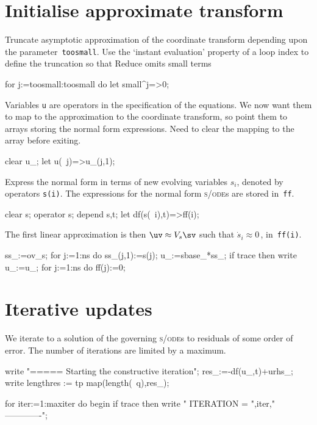 \documentclass[11pt,a5paper]{article}
\def\sde{\textsc{s/ode}}
\begin{document}
\section{Initialise approximate transform}

Truncate asymptotic approximation of the coordinate
transform depending upon the parameter~\verb|toosmall|. Use
the `instant evaluation' property of a loop index to define
the truncation so that Reduce omits small terms 
\begin{reduce}
for j:=toosmall:toosmall do let small^j=>0;
\end{reduce}

Variables \verb|u| are operators in
the specification of the equations. We now want them to map
to the approximation to the coordinate transform, so point
them to arrays storing the normal form expressions.  Need to
clear the mapping to the array before exiting.
\begin{reduce}
clear u_;
let u(~j)=>u_(j,1);
\end{reduce}

Express the normal form in terms of new evolving variables
$s_i$, denoted by operators \verb|s(i)|. The expressions for
the normal form \sde{}s are stored in~\verb|ff|.
\begin{reduce}
clear s;
operator s;
depend s,t;
let df(s(~i),t)=>ff(i);
\end{reduce}

The first linear approximation is then $\uv \approx V_s\sv$
such that $\dot s_i \approx 0$\,, in~\verb|ff(i)|. 
\begin{reduce}
ss_:=ov_s;
for j:=1:ns do ss_(j,1):=s(j);
u_:=sbase_*ss_;
if trace then write u_:=u_;
for j:=1:ns do ff(j):=0;
\end{reduce}





\section{Iterative updates}

We iterate to a solution of the governing \sde{}s to
residuals of some order of error. The number of iterations
are limited by a maximum.
\begin{reduce}
write "===== Starting the constructive iteration";
res_:=-df(u_,t)+urhs_;
write lengthres := tp map(length(~q),res_);

for iter:=1:maxiter do begin
  if trace then write "
  ITERATION = ",iter,"
  -------------";
\end{reduce}
\end{document}
